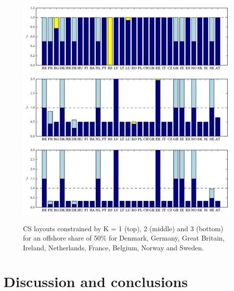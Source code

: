 \documentclass[a4paper, 12pt, sort&compress]{elsarticle}%
\newcommand{\chromowidth}{1.05 \columnwidth}
\begin{document}
\begin{figure}[h!]
  \centering
  \includegraphics[width = \chromowidth, center]{k=1offshore50pct}
  \includegraphics[width = \chromowidth, center]{k=2offshore50pct}
  \includegraphics[width = \chromowidth, center]{k=3offshore50pct}
  \caption{CS layouts constrained by K = 1 (top), 2 (middle) and 3
    (bottom) for an offshore share of 50\% for Denmark, Germany, Great
    Britain, Ireland, Netherlands, France, Belgium, Norway and
    Sweden.}
  \label{fig:layout-offshore}
\end{figure}

\section{Discussion and conclusions}
\label{sec:four}
\end{document}
